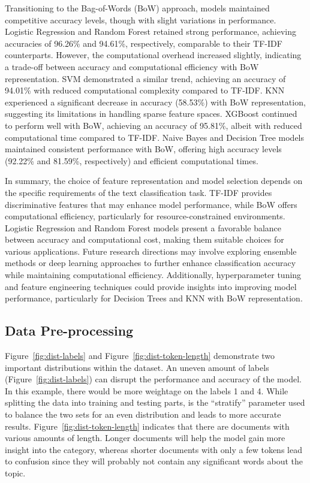 Transitioning to the Bag-of-Words (BoW) approach, models maintained competitive accuracy levels, though with slight variations in performance. Logistic Regression and Random Forest retained strong performance, achieving accuracies of 96.26\% and 94.61\%, respectively, comparable to their TF-IDF counterparts. However, the computational overhead increased slightly, indicating a trade-off between accuracy and computational efficiency with BoW representation. SVM demonstrated a similar trend, achieving an accuracy of 94.01\% with reduced computational complexity compared to TF-IDF. KNN experienced a significant decrease in accuracy (58.53\%) with BoW representation, suggesting its limitations in handling sparse feature spaces. XGBoost continued to perform well with BoW, achieving an accuracy of 95.81\%, albeit with reduced computational time compared to TF-IDF. Naive Bayes and Decision Tree models maintained consistent performance with BoW, offering high accuracy levels (92.22\% and 81.59\%, respectively) and efficient computational times.

In summary, the choice of feature representation and model selection depends on the specific requirements of the text classification task. TF-IDF provides discriminative features that may enhance model performance, while BoW offers computational efficiency, particularly for resource-constrained environments. Logistic Regression and Random Forest models present a favorable balance between accuracy and computational cost, making them suitable choices for various applications. Future research directions may involve exploring ensemble methods or deep learning approaches to further enhance classification accuracy while maintaining computational efficiency. Additionally, hyperparameter tuning and feature engineering techniques could provide insights into improving model performance, particularly for Decision Trees and KNN with BoW representation.

\subsection{Data Pre-processing}

Figure~\ref{fig:dist-labels} and Figure~\ref{fig:dist-token-length} demonstrate two important distributions within the dataset. An uneven amount of labels (Figure~\ref{fig:dist-labels}) can disrupt the performance and accuracy of the model. In this example, there would be more weightage on the labels 1 and 4. While splitting the data into training and testing parts, is the “stratify” parameter used to balance the two sets for an even distribution and leads to more accurate results. Figure~\ref{fig:dist-token-length} indicates that there are documents with various amounts of length. Longer documents will help the model gain more insight into the category, whereas shorter documents with only a few tokens lead to confusion since they will probably not contain any significant words about the topic.

